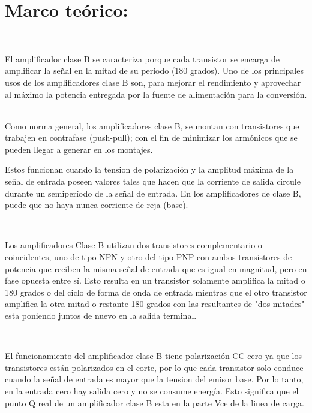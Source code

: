 \documentclass[12pt,letterpaper]{article}
\begin{document}
\section{Marco teórico:}
\

El amplificador clase B se caracteriza porque cada transistor se encarga de amplificar la señal en la mitad de su periodo (180 grados).
Uno de los principales usos de los amplificadores clase B son, para mejorar el rendimiento y aprovechar al máximo la potencia entregada por la fuente de alimentación para la conversión.
\

Como norma general, los amplificadores clase B, se montan con transistores que trabajen en contrafase (push-pull); con el fin de minimizar los armónicos que se pueden llegar a generar en los montajes.

Estos funcionan cuando la tension de polarización y la amplitud máxima de la señal de entrada poseen valores tales que hacen que la corriente de salida circule durante un semiperíodo de la señal de entrada.
En los amplificadores de clase B, puede que no haya nunca corriente de reja (base).

\

Los amplificadores Clase B utilizan dos transistores complementario o coincidentes, uno de tipo NPN y otro del tipo PNP con ambos transistores de potencia que reciben la misma señal de entrada que es igual en magnitud, pero en fase opuesta entre sí. Esto resulta en un transistor solamente amplifica la mitad o 180 grados o del ciclo de forma de onda de entrada mientras que el otro transistor amplifica la otra mitad o restante 180 grados con las resultantes de "dos mitades" esta poniendo juntos de nuevo en la salida terminal.

\

El funcionamiento del amplificador clase B tiene polarización CC cero ya que los transistores están polarizados en el corte, por lo que cada transistor solo conduce cuando la señal de entrada es mayor que la tension del emisor base. Por lo tanto, en la entrada cero hay salida cero y no se consume energía. Esto significa que el punto Q real de un amplificador clase B esta en la parte Vce de la linea de carga.

\
\end{document}
